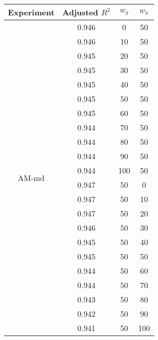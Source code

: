 \documentclass{article}
\begin{document}
\begin{table}[h]
  \centering
  \begin{tabular}{c c c c}
    \toprule
    Experiment                & Adjusted $R^2$ & $w_g$ & $w_h$ \\
    \midrule
    \multirow{22}{*}{AM-md} & 0.946 & 0 & 50 \\
                              & 0.946 & 10  & 50 \\
                              & 0.945 & 20  & 50 \\
                              & 0.945 & 30  & 50 \\
                              & 0.945 & 40  & 50 \\
                              & 0.945 & 50  & 50 \\
                              & 0.945 & 60  & 50 \\
                              & 0.944 & 70  & 50 \\
                              & 0.944 & 80  & 50 \\
                              & 0.944 & 90  & 50 \\
                              & 0.944 & 100 & 50 \\
                              & 0.947 & 50  & 0 \\
                              & 0.947 & 50  & 10 \\
                              & 0.947 & 50  & 20 \\
                              & 0.946 & 50  & 30 \\
                              & 0.945 & 50  & 40 \\
                              & 0.945 & 50  & 50 \\
                              & 0.944 & 50  & 60 \\
                              & 0.944 & 50  & 70 \\
                              & 0.943 & 50  & 80 \\
                              & 0.942 & 50  & 90 \\
                              & 0.941 & 50  & 100 \\
    \bottomrule
  \end{tabular}
\end{table}
\end{document}
